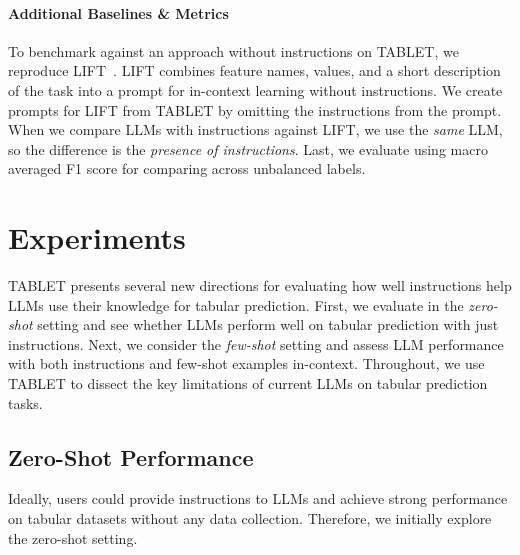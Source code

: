 \paragraph{Additional Baselines \& Metrics} To benchmark against an approach without instructions on TABLET, we reproduce LIFT~\cite{lift}. LIFT combines feature names, values, and a short description of the task into a prompt for in-context learning without instructions. We create prompts for LIFT from TABLET by omitting the instructions from the prompt. When we compare LLMs with instructions against LIFT, we use the \textit{same} LLM, so the difference is the \textit{presence of instructions}. Last, we evaluate using macro averaged F1 score for comparing across unbalanced labels.

\section{Experiments}

TABLET presents several new directions for evaluating how well instructions help LLMs use their knowledge for tabular prediction. First, we evaluate in the \textit{zero-shot} setting and see whether LLMs perform well on tabular prediction with just instructions. Next, we consider the \textit{few-shot} setting and assess LLM performance with both instructions and few-shot examples in-context. Throughout, we use TABLET to dissect the key limitations of current LLMs on tabular prediction tasks.

\subsection{Zero-Shot Performance}

Ideally, users could provide instructions to LLMs and achieve strong performance on tabular datasets without any data collection. Therefore, we initially explore the zero-shot setting.

